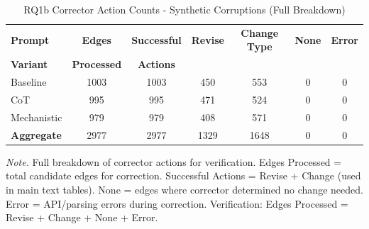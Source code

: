 \begin{table}[H]
\centreing
\caption{RQ1b Corrector Action Counts - Synthetic Corruptions (Full Breakdown)}
\label{tab:rq1b_action_counts_synthetic}
\begin{threeparttable}
\begin{tabular}{lcccccc}
\toprule
\textbf{Prompt} & \textbf{Edges} & \textbf{Successful} & \textbf{Revise} & \textbf{Change Type} & \textbf{None} & \textbf{Error} \\
\textbf{Variant} & \textbf{Processed} & \textbf{Actions} & & & & \\
\midrule
Baseline & 1003 & 1003 & 450 & 553 & 0 & 0 \\
CoT & 995 & 995 & 471 & 524 & 0 & 0 \\
Mechanistic & 979 & 979 & 408 & 571 & 0 & 0 \\
\midrule
\textbf{Aggregate} & 2977 & 2977 & 1329 & 1648 & 0 & 0 \\
\bottomrule
\end{tabular}
\begin{tablenotes}
\small
\item \textit{Note.} Full breakdown of corrector actions for verification. 
Edges Processed = total candidate edges for correction.
Successful Actions = Revise + Change (used in main text tables).
None = edges where corrector determined no change needed.
Error = API/parsing errors during correction.
Verification: Edges Processed = Revise + Change + None + Error.
\end{tablenotes}
\end{threeparttable}
\end{table}
